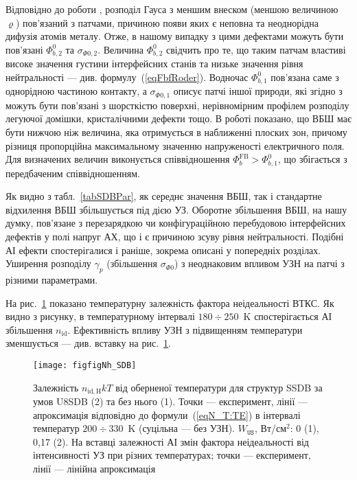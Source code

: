 Відповідно до роботи \cite{Jiang:DGJap},
розподіл Гауса з меншим внеском (меншою величиною $\varrho$) пов'язаний з патчами, причиною появи яких є
неповна та неоднорідна дифузія атомів металу.
Отже, в нашому випадку з цими дефектами можуть бути пов'язані $\Phi_{b,2}^0$ та $\sigma_{\Phi0,2}$.
Величина $\Phi_{b,2}^0$ свідчить про те, що таким патчам властиві високе значення густини інтерфейсних станів та низьке значення рівня нейтральності --- див. формулу~(\ref{eqFbfRoder}).
Водночас $\Phi_{b,1}^0$ пов'язана саме з однорідною частиною контакту,
а $\sigma_{\Phi0,1}$ описує патчі іншої природи, які згідно з \cite{Gammon2013} можуть бути пов'язані з шорсткістю поверхні,
нерівномірним профілем розподілу легуючої домішки, кристалічними дефекти тощо.
В роботі \cite{Rhoderick1988} показано, що ВБШ має бути нижчою ніж величина, яка отримується в наближенні плоских зон,
причому різниця пропорційна максимальному значенню напруженості електричного поля.
Для визначених величин виконується співвідношення $\Phi_{b}^\mathrm{FB}>\Phi_{b,1}^0$, що  збігається з передбаченим співвідношенням.

Як видно з табл.~\ref{tabSDBPar}, як середнє значення ВБШ, так і стандартне відхилення ВБШ збільшується під дією УЗ.
Оборотне збільшення ВБШ, на нашу думку, пов'язане з перезарядкою чи конфігураційною перебудовою інтерфейсних дефектів у полі напруг
АХ, що і є причиною зсуву рівня нейтральності.
Подібні АІ ефекти спостерігалися і раніше, зокрема описані у попередніх розділах.
Уширення розподілу $\gamma_p$ (збільшення $\sigma_{\Phi0}$) з неоднаковим впливом УЗН на патчі з різними параметрами.

На рис.~\ref{figfigNh_SDB} показано температурну залежність фактора неідеальності ВТКС.
Як видно з рисунку, в температурному інтервалі $180\div250$~K спостерігається АІ збільшення $n_\mathrm{id}$.
Ефективність впливу УЗН з підвищенням температури зменшується --- див. вставку на рис.~\ref{figfigNh_SDB}.

\begin{figure}
\center
\texttt{[image: figfigNh\_SDB]}
\caption{\label{figfigNh_SDB}
Залежність $n_\mathrm{id,H}kT$ від оберненої температури для структур SSDB за умов U8SDB (2) та без нього (1).
Точки --- експеримент, лінії --- апроксимація відповідно до формули~(\ref{eqN_T:TE}) в інтервалі
температур $200\div330$~K (суцільна --- без УЗН).
$W_\mathtt{US}$,  Вт/см$^2$: 0 (1), 0,17 (2).
На вставці залежності АІ змін фактора неідеальності від інтенсивності УЗ при різних температурах;
точки --- експеримент, лінії --- лінійна апроксимація
}%
\end{figure}

